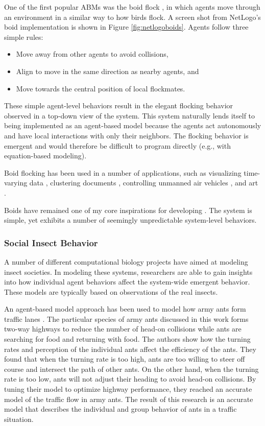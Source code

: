One of the first popular ABMs was the boid flock \cite{reynolds1987,reynolds1999sba}, in which agents move through an environment in a similar way to how birds flock.
A screen shot from NetLogo's boid implementation \cite{flocking} is shown in Figure \ref{fig:netlogoboids}.
Agents follow three simple rules:
   \begin{itemize}
      \item Move away from other agents to avoid collisions,
      \item Align to move in the same direction as nearby agents, and
      \item Move towards the central position of local flockmates.
   \end{itemize}
These simple agent-level behaviors result in the elegant flocking behavior observed in a top-down view of the system.
This system naturally lends itself to being implemented as an agent-based model because the agents act autonomously and have local interactions with only their neighbors.
The flocking behavior is emergent and would therefore be difficult to program directly (e.g., with equation-based modeling).

Boid flocking has been used in a number of applications, such as visualizing time-varying data \cite{1382896}, clustering documents \cite{cui2006flocking}, controlling unmanned air vehicles \cite{crowther2003flocking}, and art \cite{Boyd}.

Boids have remained one of my core inspirations for developing \fw.
The system is simple, yet exhibits a number of seemingly unpredictable system-level behaviors.

\subsubsection{Social Insect Behavior}

A number of different computational biology projects have aimed at modeling insect societies.
In modeling these systems, researchers are able to gain insights into how individual agent behaviors affect the system-wide emergent behavior.
These models are typically based on observations of the real insects.

An agent-based model approach has been used to model how army ants form traffic lanes \cite{couzin2003sol}.
The particular species of army ants discussed in this work forms two-way highways to reduce the number of head-on collisions while ants are searching for food and returning with food.
The authors show how the turning rates and perception of the individual ants affect the efficiency of the ants.
They found that when the turning rate is too high, ants are too willing to steer off course and intersect the path of other ants.
On the other hand, when the turning rate is too low, ants will not adjust their heading to avoid head-on collisions.
By tuning their model to optimize highway performance, they reached an accurate model of the traffic flow in army ants.
The result of this research is an accurate model that describes the individual and group behavior of ants in a traffic situation.

